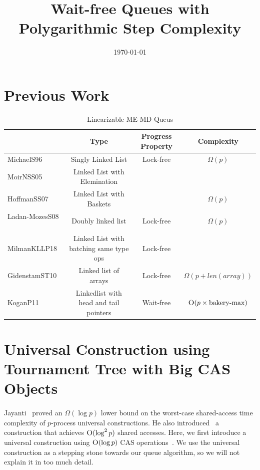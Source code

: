 \documentclass[10pt]{article}
\title{Wait-free Queues with Polygarithmic Step Complexity}
\date{\today}
\theoremstyle{definition}
\begin{document}
\maketitle


\section{Previous Work}
\begin{table}[hbt]
  \begin{center}
  \begin{tabular}{l|c|c|c}
    & Type & Progress Property  & Complexity \\ \hline
    MichaelS96~\cite{DBLP:conf/podc/MichaelS96} & Singly Linked List & Lock-free & $\Omega(p)$ \\ \hline
    MoirNSS05~\cite{DBLP:conf/spaa/MoirNSS05} & Linked List with Elemination & & \\ \hline
    HoffmanSS07~\cite{DBLP:conf/opodis/HoffmanSS07} & Linked List with Baskets & & $\Omega(p)$ \\ \hline
    Ladan-MozesS08 ~\cite{DBLP:journals/dc/Ladan-MozesS08} & Doubly linked list & Lock-free & $\Omega(p)$ \\ \hline
    MilmanKLLP18~\cite{DBLP:conf/spaa/MilmanKLLP18} & Linked List with batching same type ops & Lock-free & \\ \hline
    GidenstamST10~\cite{DBLP:conf/opodis/GidenstamST10} & Linked list of arrays & Lock-free & $\Omega(p+len(array))$ \\ \hline
    KoganP11~\cite{DBLP:conf/ppopp/KoganP11} &  Linkedlist with head and tail pointers & Wait-free & $\textsc{O}(p\times\text{bakery-max})$
  \end{tabular}
  \caption{Linearizable ME-MD Queus}
  \end{center}
\end{table}

\section{ Universal Construction using Tournament Tree with Big CAS Objects }
\paragraph{}
Jayanti~\cite{DBLP:conf/podc/Jayanti98a} proved an $\Omega(\log p)$ lower bound on the worst-case shared-access time complexity of $p$-process universal constructions. He also introduced~\cite{DBLP:conf/podc/ChandraJT98} a construction that achieves $\textsc{O}(\log^2 p)$ shared accesses. Here, we first introduce a universal construction using $\textsc{O}(\log p)$ CAS operations~\cite{DBLP:conf/fsttcs/JayantiP05}. We use the universal construction as a stepping stone towards our queue algorithm, so we will not explain it in too much detail.
\end{document}
